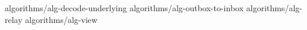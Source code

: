 %
%
%
%
{algorithms/alg-decode-underlying}
{algorithms/alg-outbox-to-inbox}
{algorithms/alg-relay}
{algorithms/alg-view}
